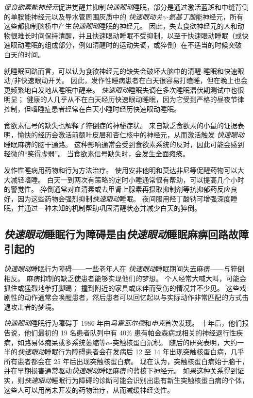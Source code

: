 \textit{促食欲素能神经元}促进觉醒并抑制\textit{快速眼动}睡眠，部分是通过激活蓝斑和中缝背侧的单胺能神经元以及导水管周围灰质中的 \textit{快速眼动关}\textit{$\gamma$-氨基丁酸}能神经元，所有这些都抑制脑桥中产生\textit{快速眼动}睡眠的神经元。
因此，失去食欲神经元的人和动物很难长时间保持清醒，并且快速眼动睡眠不受抑制，以至于快速眼动睡眠（或快速眼动睡眠的组成部分，例如清醒时的运动失调，或猝倒）在不适当的时候突破 白天的时间。


就睡眠回路而言，可以认为食欲神经元的缺失会破坏大脑中的清醒-睡眠和快速眼动/非快速眼动开关。
因此，发作性睡病患者在白天很容易打瞌睡，但在晚上也会更频繁地自发地从睡眠中醒来。
\textit{快速眼动}睡眠失调在多次睡眠潜伏期测试中也很明显；
健康的人几乎从不在白天经历快速眼动睡眠，因为它受到严格的昼夜节律控制，但嗜睡症患者经常在白天小睡时经历快速眼动睡眠。


食欲素信号的缺失也解释了猝倒症的神秘症状。
来自缺乏食欲素的小鼠的证据表明，愉快的经历会激活前额叶皮层和杏仁核中的神经元，从而激活触发 \textit{快速眼动}睡眠麻痹的脑干通路。
这种影响通常会受到食欲素系统的反对，因此可能会感到轻微的“笑得虚弱”。
当食欲素信号缺失时，会发生全面瘫痪。


发作性睡病用药物和行为方法治疗。
使用安非他明和莫达非尼等促醒药物可以大大减轻嗜睡。
白天一到两次有策略的定时小睡通常很有帮助，可以提高几个小时的警觉性。
猝倒通常对血清素或去甲肾上腺素再摄取抑制剂等抗抑郁药反应良好，因为这些药物会强烈抑制\textit{快速眼动}睡眠。
夜间服用羟丁酸钠可增强深度睡眠，并通过一种未知的机制帮助巩固清醒状态并减少白天的猝倒。



\subsection{\textit{快速眼动}睡眠行为障碍是由\textit{快速眼动}睡眠麻痹回路故障引起的}

\textit{快速眼动}睡眠行为障碍——一些老年人在 \textit{快速眼动}睡眠期间失去麻痹——与猝倒相反。
麻痹抑制的缺乏使患者能够实现他们的梦想。
个人经常大喊大叫，可能会抓住或猛烈地拳打脚踢；
撞到附近的家具或床伴而受伤的情况并不少见。
这些戏剧性的动作通常会唤醒患者，然后患者可以回忆起以与实际动作非常匹配的方式击退攻击者的梦境。


\textit{快速眼动}睡眠行为障碍于 1986 年由\textit{马霍瓦尔德}和\textit{申克}首次发现。
十年后，他们报告说，他们最初的 19 名患者队列中有 40\% 患有帕金森病或相关的神经退行性疾病，如路易体痴呆或多系统萎缩等$ \alpha $-突触核蛋白沉积。
随后的研究表明，大约一半的\textit{快速眼动}睡眠行为障碍患者会在发病后 12 至 14 年出现突触核蛋白病，几乎所有患者都会在 25 年后出现突触核蛋白病。
现在认为，突触核蛋白病始于脑干，并在早期损害通常驱动\textit{快速眼动}睡眠麻痹的蓝核下神经元。
如果这种关系得到证实，则\textit{快速眼动}睡眠行为障碍的诊断可能会识别出患有新生突触核蛋白病的个体，这些人可以用尚未开发的药物治疗，从而减缓神经变性。



